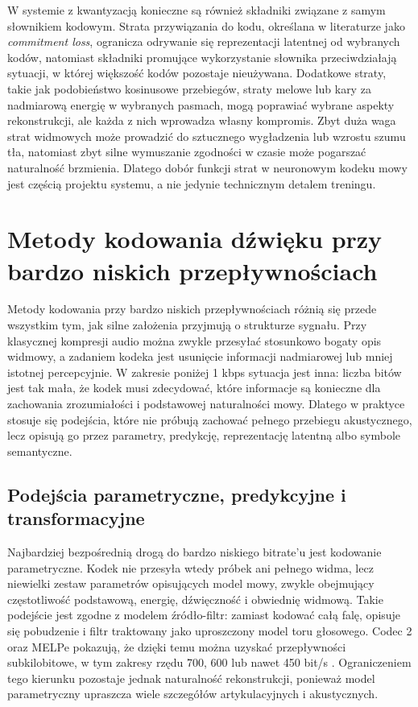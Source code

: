 W systemie z kwantyzacją konieczne są również składniki związane z samym słownikiem kodowym. Strata przywiązania do kodu, określana w literaturze jako \emph{commitment loss}, ogranicza odrywanie się reprezentacji latentnej od wybranych kodów, natomiast składniki promujące wykorzystanie słownika przeciwdziałają sytuacji, w której większość kodów pozostaje nieużywana. Dodatkowe straty, takie jak podobieństwo kosinusowe przebiegów, straty melowe lub kary za nadmiarową energię w wybranych pasmach, mogą poprawiać wybrane aspekty rekonstrukcji, ale każda z nich wprowadza własny kompromis. Zbyt duża waga strat widmowych może prowadzić do sztucznego wygładzenia lub wzrostu szumu tła, natomiast zbyt silne wymuszanie zgodności w czasie może pogarszać naturalność brzmienia. Dlatego dobór funkcji strat w neuronowym kodeku mowy jest częścią projektu systemu, a nie jedynie technicznym detalem treningu.

\section{Metody kodowania dźwięku przy bardzo niskich przepływnościach}
\label{sec:metody-kodowania-ultra-low}

Metody kodowania przy bardzo niskich przepływnościach różnią się przede wszystkim tym, jak silne założenia przyjmują o strukturze sygnału. Przy klasycznej kompresji audio można zwykle przesyłać stosunkowo bogaty opis widmowy, a zadaniem kodeka jest usunięcie informacji nadmiarowej lub mniej istotnej percepcyjnie. W zakresie poniżej 1 kbps sytuacja jest inna: liczba bitów jest tak mała, że kodek musi zdecydować, które informacje są konieczne dla zachowania zrozumiałości i podstawowej naturalności mowy. Dlatego w praktyce stosuje się podejścia, które nie próbują zachować pełnego przebiegu akustycznego, lecz opisują go przez parametry, predykcję, reprezentację latentną albo symbole semantyczne.

\subsection{Podejścia parametryczne, predykcyjne i transformacyjne}
\label{subsec:parametryczne-predykcyjne-transformacyjne}

Najbardziej bezpośrednią drogą do bardzo niskiego bitrate'u jest kodowanie parametryczne. Kodek nie przesyła wtedy próbek ani pełnego widma, lecz niewielki zestaw parametrów opisujących model mowy, zwykle obejmujący częstotliwość podstawową, energię, dźwięczność i obwiednię widmową. Takie podejście jest zgodne z modelem źródło-filtr: zamiast kodować całą falę, opisuje się pobudzenie i filtr traktowany jako uproszczony model toru głosowego. Codec 2 oraz MELPe pokazują, że dzięki temu można uzyskać przepływności subkilobitowe, w tym zakresy rzędu 700, 600 lub nawet 450 bit/s \cite{Rowe2019Codec2,Rowe2021Codec2450,NATO2015STANAG4591}. Ograniczeniem tego kierunku pozostaje jednak naturalność rekonstrukcji, ponieważ model parametryczny upraszcza wiele szczegółów artykulacyjnych i akustycznych.

